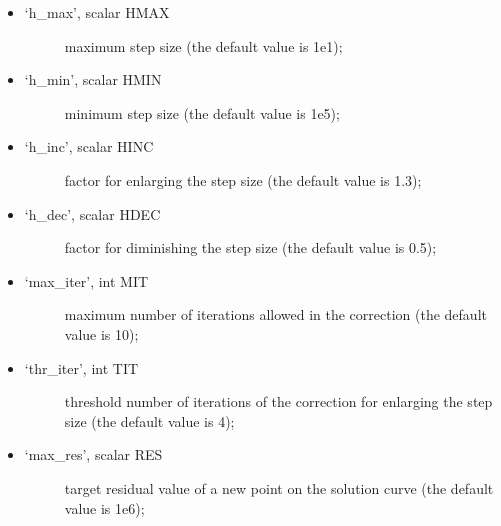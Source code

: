 \documentclass[a4paper,11pt,english]{sphinxmanual}
\begin{document}
\begin{fulllineitems}
\begin{itemize}
\begin{itemize}
\begin{description}
\end{description}

\item {} \begin{description}
\item[{‘h\_max’, scalar HMAX}] \leavevmode
maximum step size (the default value is 1e\sphinxhyphen{}1);

\end{description}

\item {} \begin{description}
\item[{‘h\_min’, scalar HMIN}] \leavevmode
minimum step size (the default value is 1e\sphinxhyphen{}5);

\end{description}

\item {} \begin{description}
\item[{‘h\_inc’, scalar HINC}] \leavevmode
factor for enlarging the step size (the default value is 1.3);

\end{description}

\item {} \begin{description}
\item[{‘h\_dec’, scalar HDEC}] \leavevmode
factor for diminishing the step size (the default value is 0.5);

\end{description}

\item {} \begin{description}
\item[{‘max\_iter’, int MIT}] \leavevmode
maximum number of iterations allowed in the correction (the default
value is 10);

\end{description}

\item {} \begin{description}
\item[{‘thr\_iter’, int TIT}] \leavevmode
threshold number of iterations of the correction for enlarging the
step size (the default value is 4);

\end{description}

\item {} \begin{description}
\item[{‘max\_res’, scalar RES}] \leavevmode
target residual value of a new point on the solution curve (the
default value is 1e\sphinxhyphen{}6);


\end{description}
\end{itemize}
\end{itemize}
\end{fulllineitems}
\end{document}
